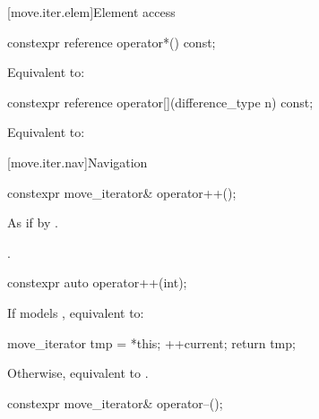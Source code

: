 \documentclass{wg21}
\begin{document}
[move.iter.elem]{Element access}

%
\begin{itemdecl}
	constexpr reference operator*() const;
\end{itemdecl}

\begin{itemdescr}
	\pnum
	\effects Equivalent to: 
\end{itemdescr}

%
\begin{itemdecl}
	constexpr reference operator[](difference_type n) const;
\end{itemdecl}

\begin{itemdescr}
	\pnum
	\effects Equivalent to: 
\end{itemdescr}

[move.iter.nav]{Navigation}

%
\begin{itemdecl}
	constexpr move_iterator& operator++();
\end{itemdecl}

\begin{itemdescr}
	\pnum
	\effects As if by .
	
	\pnum
	\returns {}.
\end{itemdescr}

%
\begin{itemdecl}
	constexpr auto operator++(int);
\end{itemdecl}

\begin{itemdescr}
	\pnum

	\effects
	If  models , equivalent to:
	\begin{codeblock}
		move_iterator tmp = *this;
		++current;
		return tmp;
	\end{codeblock}
	Otherwise, equivalent to .
\end{itemdescr}

%
\begin{itemdecl}
	constexpr move_iterator& operator--();
\end{itemdecl}
\end{document}
